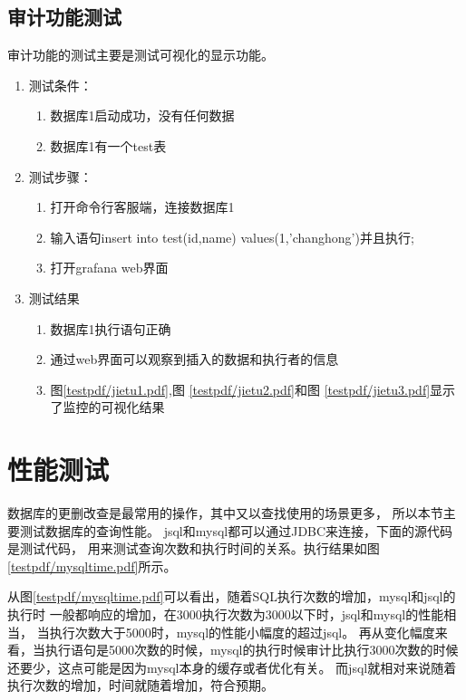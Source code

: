 \subsection{审计功能测试}
审计功能的测试主要是测试可视化的显示功能。
\begin{enumerate}
	\item 测试条件：
	\begin{enumerate}
		\item 数据库1启动成功，没有任何数据
		\item 数据库1有一个test表
	\end{enumerate}
	\item 测试步骤：
	\begin{enumerate}
		\item 打开命令行客服端，连接数据库1
		\item 输入语句insert into test(id,name) values(1,'changhong')并且执行;
		\item 打开grafana web界面
	\end{enumerate}
	\item 	测试结果
	\begin{enumerate}
		\item 数据库1执行语句正确
		\item 通过web界面可以观察到插入的数据和执行者的信息
		\item 图\ref{testpdf/jietu1.pdf},图
		\ref{testpdf/jietu2.pdf}和图
		\ref{testpdf/jietu3.pdf}显示了监控的可视化结果
	\end{enumerate}
\end{enumerate}	

\section{性能测试}
数据库的更删改查是最常用的操作，其中又以查找使用的场景更多，
所以本节主要测试数据库的查询性能。
jsql和mysql都可以通过JDBC来连接，下面的源代码是测试代码，
用来测试查询次数和执行时间的关系。执行结果如图\ref{testpdf/mysqltime.pdf}所示。



从图\ref{testpdf/mysqltime.pdf}可以看出，随着SQL执行次数的增加，mysql和jsql的执行时
一般都响应的增加，在3000执行次数为3000以下时，jsql和mysql的性能相当，
当执行次数大于5000时，mysql的性能小幅度的超过jsql。
再从变化幅度来看，当执行语句是5000次数的时候，mysql的执行时候审计比执行3000次数的时候
还要少，这点可能是因为mysql本身的缓存或者优化有关。
而jsql就相对来说随着执行次数的增加，时间就随着增加，符合预期。

